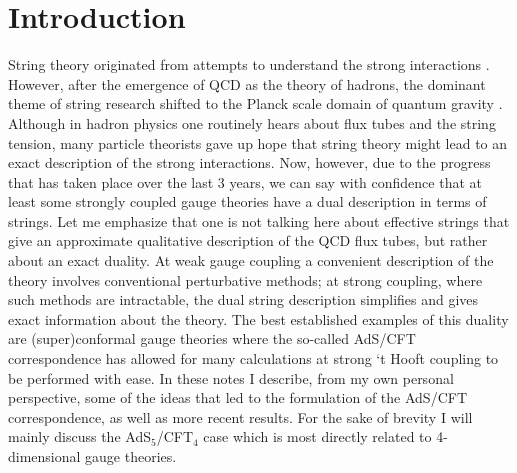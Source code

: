 \def\rmax{{r_{\rm max}}}
\def\gone#1{}



\section{Introduction}

String theory originated from attempts to understand 
the strong interactions \cite{NNS}. However, after the emergence of QCD
as the theory of hadrons, the dominant theme of string research
shifted to the Planck scale domain of quantum gravity \cite{Scherk}. 
Although in hadron physics one routinely hears about flux tubes
and the string tension, many particle theorists gave up hope
that string theory might lead to an exact description 
of the strong interactions.
Now, however, due to the progress that has taken place
over the last 3 years, we can say with confidence
that at least some strongly coupled gauge theories have a dual description
in terms of strings. Let me emphasize that one is not talking here about
effective strings that give an approximate qualitative description
of the QCD flux tubes, but
rather about an exact duality. At weak gauge coupling a convenient
description of the theory involves conventional perturbative methods;
at strong coupling, where such methods are intractable, the dual string
description simplifies and gives exact information about the theory.
The best established examples of this duality are 
(super)conformal gauge theories
where the so-called AdS/CFT correspondence \cite{jthroat,US,EW}
has allowed for many calculations
at strong `t Hooft coupling to be performed with ease. 
In these notes I describe,
from my own personal perspective, some of the ideas that led to the formulation
of the AdS/CFT correspondence, as well as more recent results. 
For the sake of brevity I will mainly discuss the
AdS$_5$/CFT$_4$ case which is most directly related to 4-dimensional
gauge theories.

